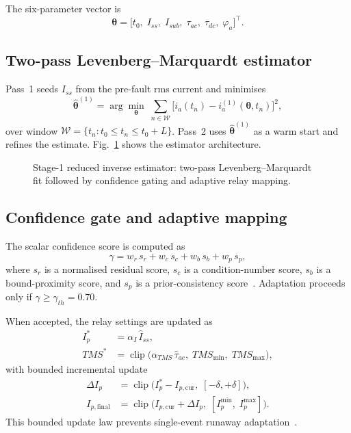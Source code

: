 \documentclass[journal,twoside,letterpaper]{IEEEtran}
\newcommand{\vect}[1]{\bm{#1}}
\DeclareMathOperator{\clip}{clip}
\begin{document}
The six-parameter vector is
\begin{equation}
  \vect\theta = \bigl[t_0,\;I_{ss},\;I_{sub},\;
                      \tau_{ac},\;\tau_{dc},\;\varphi_a\bigr]^\top.
\label{eq:theta}
\end{equation}

\subsection{Two-pass Levenberg--Marquardt estimator}

Pass~1 seeds $I_{ss}$ from the pre-fault rms current and
minimises
\begin{equation}
  \hat{\vect\theta}^{(1)} = \arg\min_{\vect\theta}\;
    \sum_{n \in \mathcal{W}}\bigl[i_a(t_n) -
    i_a^{(1)}(\vect\theta, t_n)\bigr]^2,
\label{eq:lm}
\end{equation}
over window $\mathcal{W} = \{t_n : t_0 \leq t_n \leq t_0+L\}$.
Pass~2 uses $\hat{\vect\theta}^{(1)}$ as a warm start and
refines the estimate.
Fig.~\ref{fig:estimator_recap} shows the estimator
architecture.

\begin{figure}[!t]
  \centering
  
  \caption{Stage-1 reduced inverse estimator: two-pass
    Levenberg--Marquardt fit followed by confidence gating
    and adaptive relay mapping.}
  \label{fig:estimator_recap}
\end{figure}

\subsection{Confidence gate and adaptive mapping}

The scalar confidence score is computed as
\begin{equation}
  \gamma = w_r\,s_r + w_c\,s_c + w_b\,s_b + w_p\,s_p,
\label{eq:confidence}
\end{equation}
where $s_r$ is a normalised residual score, $s_c$ is a
condition-number score, $s_b$ is a bound-proximity score,
and $s_p$ is a prior-consistency score~\cite{Eluvathingal2025_TR01}.
Adaptation proceeds only if $\gamma \geq \gamma_{th} = 0.70$.

When accepted, the relay settings are updated as
\begin{align}
  I_p^\ast &= \alpha_I\,\hat{I}_{ss},  \label{eq:ip_adapt}\\
  TMS^\ast &= \clip\!\bigl(\alpha_{TMS}\,\hat\tau_{ac},\;
               TMS_{\min},\;TMS_{\max}\bigr), \label{eq:tms_adapt}
\end{align}
with bounded incremental update
\begin{align}
  \Delta I_p &= \clip\!\bigl(I_p^\ast - I_{p,\mathrm{cur}},\;
                [-\delta,+\delta]\bigr),\label{eq:bounded_a}\\
  I_{p,\mathrm{final}} &= \clip\!\bigl(I_{p,\mathrm{cur}} + \Delta I_p,\;
                [I_p^{\min},\;I_p^{\max}]\bigr).\label{eq:bounded_b}
\end{align}
This bounded update law prevents single-event runaway
adaptation~\cite{Eluvathingal2025_TR01}.
\end{document}
